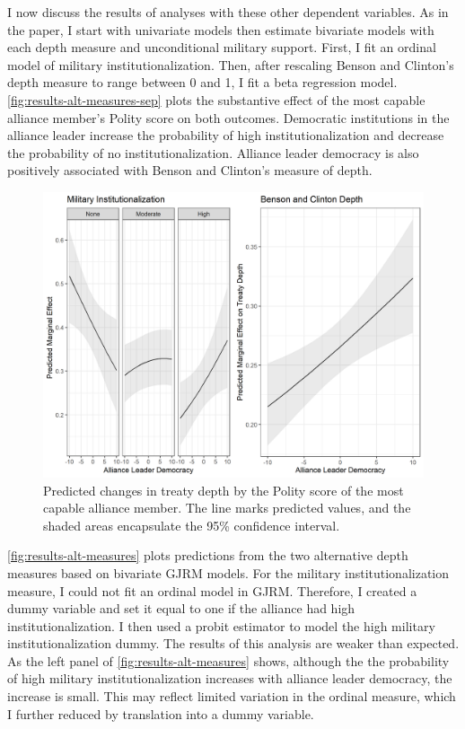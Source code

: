 \documentclass[12pt]{article}
\begin{document}
I now discuss the results of analyses with these other dependent variables. 
As in the paper, I start with univariate models then estimate bivariate models with each depth measure and unconditional military support. 
First, I fit an ordinal model of military institutionalization. 
Then, after rescaling Benson and Clinton's depth measure to range between 0 and 1, I fit a beta regression model. 
\autoref{fig:results-alt-measures-sep} plots the substantive effect of the most capable alliance member's Polity score on both outcomes. 
Democratic institutions in the alliance leader increase the probability of high institutionalization and decrease the probability of no institutionalization. 
Alliance leader democracy is also positively associated with Benson and Clinton's measure of depth. 


\begin{figure}
\includegraphics[width=.95\textwidth]{results-alt-measures-sep.png}  
\caption{Predicted changes in treaty depth by the Polity score of the most capable alliance member. The line marks predicted values, and the shaded areas encapsulate the 95\% confidence interval.}
\label{fig:results-alt-measures-sep}
\end{figure}


\autoref{fig:results-alt-measures} plots predictions from the two alternative depth measures based on bivariate GJRM models. 
For the military institutionalization measure, I could not fit an ordinal model in GJRM.
Therefore, I created a dummy variable and set it equal to one if the alliance had high institutionalization. 
I then used a probit estimator to model the high military institutionalization dummy. 
The results of this analysis are weaker than expected. 
As the left panel of \autoref{fig:results-alt-measures} shows, although the the probability of high military institutionalization increases with alliance leader democracy, the increase is small. 
This may reflect limited variation in the ordinal measure, which I further reduced by translation into a dummy variable. 
\end{document}
